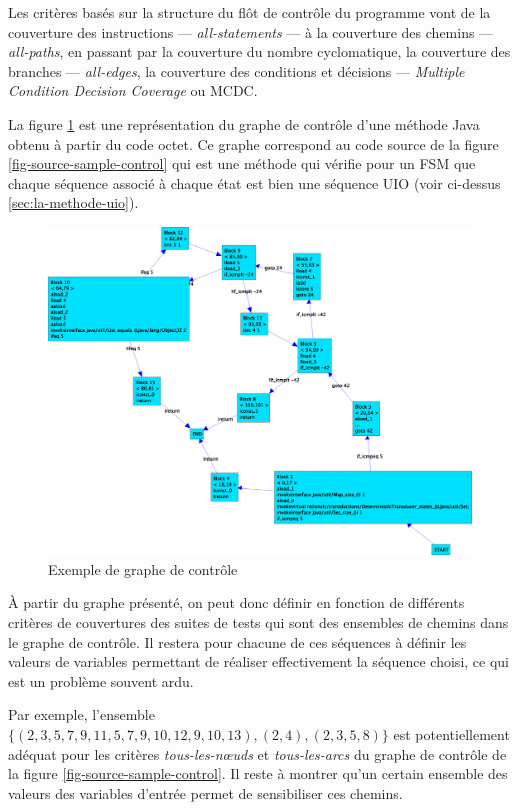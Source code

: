 Les crit\`eres bas\'es sur la structure du fl\^ot de contr\^ole du
programme vont de la couverture des instructions ---
\emph{all-statements} --- \`a la couverture des chemins ---
\emph{all-paths}, en passant par la couverture du nombre
cyclomatique, la couverture des branches --- \emph{all-edges}, la
couverture des conditions et d\'ecisions --- \emph{Multiple Condition
Decision Coverage} ou MCDC.

La figure \ref{fig-sample-control} est une repr\'esentation du
graphe de contr\^ole d'une m\'ethode \textsf{Java} obtenu \`a
partir du code octet. Ce graphe correspond au code source de la figure
\ref{fig-source-sample-control} qui est une m\'ethode qui v\'erifie
pour un \textsf{FSM} que chaque s\'equence associ\'e
\`a chaque \'etat est bien une s\'equence \textsf{UIO} (voir
ci-dessus \ref{sec:la-methode-uio}).

\begin{figure}[htbp]
    \includegraphics[width=\textwidth]{figures/fig-sample-control.eps}
    \caption{Exemple de graphe de contr\^ole}
    \label{fig-sample-control}
\end{figure}

\`A partir du graphe pr\'esent\'e, on peut donc d\'efinir en
fonction de diff\'erents crit\`eres de couvertures des
suites de tests qui sont des ensembles de chemins dans le
graphe de contr\^ole. Il restera pour chacune de ces s\'equences
\`a d\'efinir les valeurs de variables permettant de r\'ealiser
effectivement la s\'equence choisi, ce qui est un probl\`eme souvent
ardu. 

Par exemple, l'ensemble $\{(2,3,5,7,9,11,5,7,9,10,12,9,10,13), (2,4),
(2,3,5,8)\}$ est potentiellement ad\'equat pour les crit\`eres \emph{tous-les-n\oe uds} et
\emph{tous-les-arcs} du graphe de contr\^ole de  la figure
\ref{fig-source-sample-control}. Il reste \`a montrer qu'un certain
ensemble des valeurs des variables d'entr\'ee permet de sensibiliser
ces chemins.

